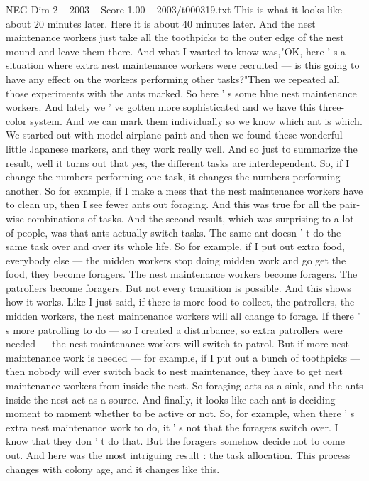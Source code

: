 \begin{textsample}{NEG Dim 2 – 2003 – Score 1.00 – 2003/t000319.txt}
This is what it looks like about 20 minutes later.
Here it is about 40 minutes later.
And the nest maintenance workers just take all the toothpicks to the outer edge of the nest mound and leave them there.
And what I wanted to know was,"OK, here ' s a situation where extra nest maintenance workers were recruited — is this going to have any effect on the workers performing other tasks?"Then we repeated all those experiments with the ants marked.
So here ' s some blue nest maintenance workers.
And lately we ' ve gotten more sophisticated and we have this three-color system.
And we can mark them individually so we know which ant is which.
We started out with model airplane paint and then we found these wonderful little Japanese markers, and they work really well.
And so just to summarize the result, well it turns out that yes, the different tasks are interdependent.
So, if I change the numbers performing one task, it changes the numbers performing another.
So for example, if I make a mess that the nest maintenance workers have to clean up, then I see fewer ants out foraging.
And this was true for all the pair-wise combinations of tasks.
And the second result, which was surprising to a lot of people, was that ants actually switch tasks.
The same ant doesn ' t do the same task over and over its whole life.
So for example, if I put out extra food, everybody else — the midden workers stop doing midden work and go get the food, they become foragers.
The nest maintenance workers become foragers.
The patrollers become foragers.
But not every transition is possible.
And this shows how it works.
Like I just said, if there is more food to collect, the patrollers, the midden workers, the nest maintenance workers will all change to forage.
If there ' s more patrolling to do — so I created a disturbance, so extra patrollers were needed — the nest maintenance workers will switch to patrol.
But if more nest maintenance work is needed — for example, if I put out a bunch of toothpicks — then nobody will ever switch back to nest maintenance, they have to get nest maintenance workers from inside the nest.
So foraging acts as a sink, and the ants inside the nest act as a source.
And finally, it looks like each ant is deciding moment to moment whether to be active or not.
So, for example, when there ' s extra nest maintenance work to do, it ' s not that the foragers switch over.
I know that they don ' t do that.
But the foragers somehow decide not to come out.
And here was the most intriguing result : the task allocation.
This process changes with colony age, and it changes like this.

\end{textsample}
